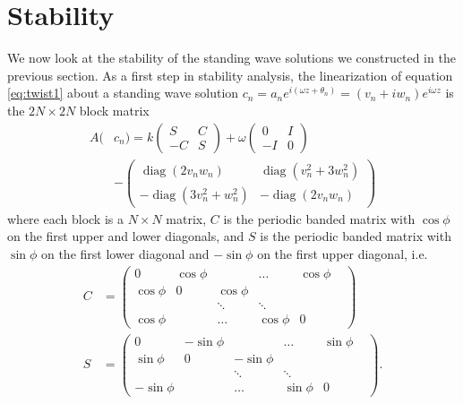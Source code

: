\documentclass[reprint, amsmath,amssymb,aps]{revtex4-2}
\DeclareMathOperator{\diag}{diag}
\begin{document}
\section{Stability}\label{sec:stability}

We now look at the stability of the standing wave solutions we constructed in the previous section. As a first step in stability analysis, the linearization of equation \cref{eq:twist1} about a standing wave solution $c_n = a_n e^{i (\omega z + \theta_n) } = (v_n + i w_n)e^{i\omega z}$ is the $2N \times 2N$ block matrix
\begin{equation}\label{eq:linearization}
\begin{aligned}
A(&c_n) =
k \begin{pmatrix}S & C \\ -C & S \end{pmatrix}
+ \omega\begin{pmatrix}0 & I \\ -I & 0 \end{pmatrix} \\
&-\begin{pmatrix} \diag(2v_n w_n) & \diag(v_n^2 + 3 w_n^2) \\
-\diag(3 v_n^2 + w_n^2) & -\diag(2v_n w_n) \end{pmatrix}
\end{aligned}
\end{equation}
where each block is a $N\times N$ matrix, $C$ is the periodic banded matrix with $\cos \phi$ on the first upper and lower diagonals, and $S$ is the periodic banded matrix with $\sin \phi$ on the first lower diagonal and $-\sin \phi$ on the first upper diagonal, i.e.
\begin{align*}
C &= \begin{pmatrix}
0 & \cos \phi & & \dots & \cos \phi \\
\cos \phi & 0 & \cos \phi & & & \\
& & \ddots & \ddots &  & \\
\cos \phi & & \dots & \cos \phi & 0
\end{pmatrix} \\
S &= \begin{pmatrix}
0 & -\sin \phi & & \dots & \sin \phi \\
\sin \phi & 0 & -\sin \phi & & & \\
& & \ddots & \ddots &  & \\
-\sin \phi & & \dots & \sin \phi & 0
\end{pmatrix}.
\end{align*}
\end{document}
